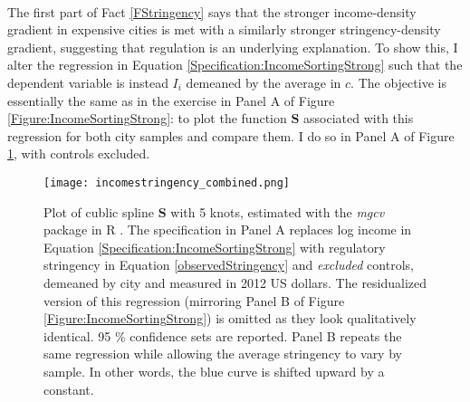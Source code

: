 \documentclass[11pt]{article}
\begin{document}
	\paragraph*{}
	The first part of Fact \ref{FStringency} says that the stronger income-density gradient in expensive cities is met with a similarly stronger stringency-density gradient, suggesting that regulation is an underlying explanation. To show this, I alter the regression in Equation \eqref{Specification:IncomeSortingStrong} such that the dependent variable is instead $I_{i}$ demeaned by the average in $c$. The objective is essentially the same as in the exercise in Panel A of Figure \ref{Figure:IncomeSortingStrong}: to plot the function $\mathbf{S}$ associated with this regression for both city samples and compare them. I do so in Panel A of Figure \ref{Figure:StringencyStrong}, with controls excluded. 
	
	\begin{figure}[!ht]
		\begin{center}
			\texttt{[image: incomestringency\_combined.png]}
			\caption{Plot of cublic spline $\mathbf{S}$ with 5 knots, estimated with the \textit{mgcv} package in R \citep{gampackage}. The specification in Panel A replaces log income in Equation \eqref{Specification:IncomeSortingStrong} with regulatory stringency in Equation \eqref{observedStringency} and \textit{excluded} controls, demeaned by city and measured in 2012 US dollars. The residualized version of this regression (mirroring Panel B of Figure \ref{Figure:IncomeSortingStrong}) is omitted as they look qualitatively identical. 95 \% confidence sets are reported. Panel B repeats the same regression while allowing the average stringency to vary by sample. In other words, the blue curve is shifted upward by a constant. }\label{Figure:StringencyStrong} 
		\end{center}
	\end{figure}
\end{document}
